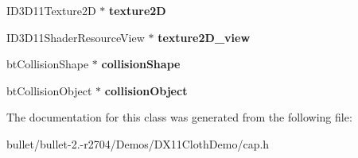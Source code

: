 \begin{DoxyCompactItemize}
\item 
\hypertarget{classcap_a794da64da831ec38a06869a5f189c22a}{I\+D3\+D11\+Texture2\+D $\ast$ {\bfseries texture2\+D}}\label{classcap_a794da64da831ec38a06869a5f189c22a}

\item 
\hypertarget{classcap_adeea009ab75181d1131dc1ae413412b6}{I\+D3\+D11\+Shader\+Resource\+View $\ast$ {\bfseries texture2\+D\+\_\+view}}\label{classcap_adeea009ab75181d1131dc1ae413412b6}

\item 
\hypertarget{classcap_a731d13c374f8f934e8b901ab57f74978}{bt\+Collision\+Shape $\ast$ {\bfseries collision\+Shape}}\label{classcap_a731d13c374f8f934e8b901ab57f74978}

\item 
\hypertarget{classcap_a4aa04d1e4fddd8b2e46ebc9744e83812}{bt\+Collision\+Object $\ast$ {\bfseries collision\+Object}}\label{classcap_a4aa04d1e4fddd8b2e46ebc9744e83812}

\end{DoxyCompactItemize}


The documentation for this class was generated from the following file\+:\begin{DoxyCompactItemize}
\item 
bullet/bullet-\/2.-\/r2704/\+Demos/\+D\+X11\+Cloth\+Demo/cap.\+h\end{DoxyCompactItemize}
